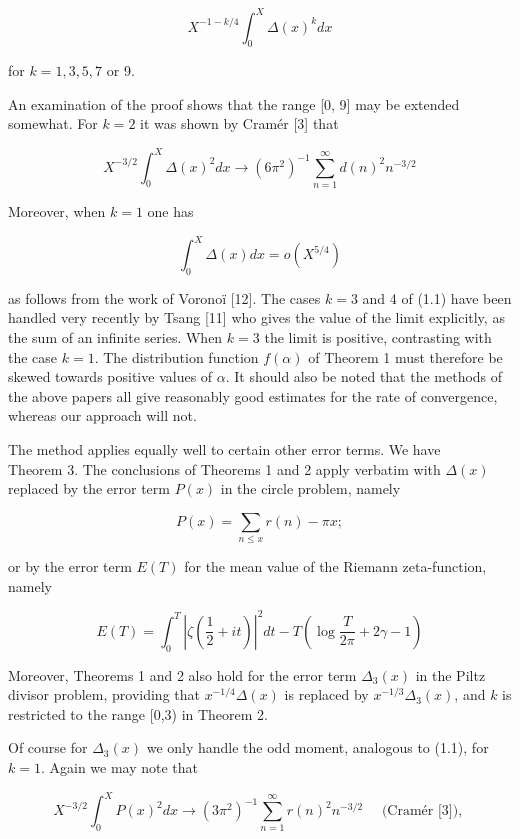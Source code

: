 \documentclass[10pt]{article}
\begin{document}
\begin{equation*}
X^{-1-k / 4} \int_{0}^{X} \Delta(x)^{k} d x \tag{1.1}
\end{equation*}


for $k=1,3,5,7$ or 9.

An examination of the proof shows that the range [0, 9] may be extended somewhat. For $k=2$ it was shown by Cramér [3] that


\begin{equation*}
X^{-3 / 2} \int_{0}^{X} \Delta(x)^{2} d x \rightarrow\left(6 \pi^{2}\right)^{-1} \sum_{n=1}^{\infty} d(n)^{2} n^{-3 / 2} \tag{1.2}
\end{equation*}


Moreover, when $k=1$ one has

$$
\int_{0}^{X} \Delta(x) d x=o\left(X^{5 / 4}\right)
$$

as follows from the work of Voronoï [12]. The cases $k=3$ and 4 of (1.1) have been handled very recently by Tsang [11] who gives the value of the limit explicitly, as the sum of an infinite series. When $k=3$ the limit is positive, contrasting with the case $k=1$. The distribution function $f(\alpha)$ of Theorem 1 must therefore be skewed towards positive values of $\alpha$. It should also be noted that the methods of the above papers all give reasonably good estimates for the rate of convergence, whereas our approach will not.

The method applies equally well to certain other error terms. We have\\
Theorem 3. The conclusions of Theorems 1 and 2 apply verbatim with $\Delta(x)$ replaced by the error term $P(x)$ in the circle problem, namely

$$
P(x)=\sum_{n \leq x} r(n)-\pi x ;
$$

or by the error term $E(T)$ for the mean value of the Riemann zeta-function, namely

$$
E(T)=\int_{0}^{T}\left|\zeta\left(\frac{1}{2}+i t\right)\right|^{2} d t-T\left(\log \frac{T}{2 \pi}+2 \gamma-1\right)
$$

Moreover, Theorems 1 and 2 also hold for the error term $\Delta_{3}(x)$ in the Piltz divisor problem, providing that $x^{-1 / 4} \Delta(x)$ is replaced by $x^{-1 / 3} \Delta_{3}(x)$, and $k$ is restricted to the range [0,3) in Theorem 2.

Of course for $\Delta_{3}(x)$ we only handle the odd moment, analogous to (1.1), for $k=1$. Again we may note that

$$
X^{-3 / 2} \int_{0}^{X} P(x)^{2} d x \rightarrow\left(3 \pi^{2}\right)^{-1} \sum_{n=1}^{\infty} r(n)^{2} n^{-3 / 2} \quad \text { (Cramér [3]), }
$$
\end{document}
